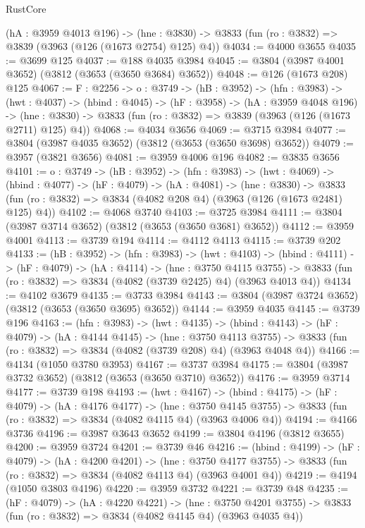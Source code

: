 \begin{lexlean}{RustCore}
\begin{coremodule}
  (hA : @3959 @4013 @196) ->
  (hne : @3830) -> @3833 (fun (ro : @3832) => @3839 (@3963 (@126 (@1673 @2754) @125) @4))
@4034 := @4000 @3655
@4035 := @3699 @125
@4037 := @188 @4035 @3984
@4045 := @3804 (@3987 @4001 @3652) (@3812 (@3653 (@3650 @3684) @3652))
@4048 := @126 (@1673 @208) @125
@4067 := {F : @2256} ->
  {o : @3749} ->
  (hB : @3952) ->
  (hfn : @3983) ->
  (hwt : @4037) ->
  (hbind : @4045) ->
  (hF : @3958) ->
  (hA : @3959 @4048 @196) ->
  (hne : @3830) -> @3833 (fun (ro : @3832) => @3839 (@3963 (@126 (@1673 @2711) @125) @4))
@4068 := @4034 @3656
@4069 := @3715 @3984
@4077 := @3804 (@3987 @4035 @3652) (@3812 (@3653 (@3650 @3698) @3652))
@4079 := @3957 (@3821 @3656)
@4081 := @3959 @4006 @196
@4082 := @3835 @3656
@4101 := {o : @3749} ->
  (hB : @3952) ->
  (hfn : @3983) ->
  (hwt : @4069) ->
  (hbind : @4077) ->
  (hF : @4079) ->
  (hA : @4081) ->
  (hne : @3830) ->
  @3833 (fun (ro : @3832) => @3834 (@4082 @208 @4) (@3963 (@126 (@1673 @2481) @125) @4))
@4102 := @4068 @3740
@4103 := @3725 @3984
@4111 := @3804 (@3987 @3714 @3652) (@3812 (@3653 (@3650 @3681) @3652))
@4112 := @3959 @4001
@4113 := @3739 @194
@4114 := @4112 @4113
@4115 := @3739 @202
@4133 := (hB : @3952) ->
  (hfn : @3983) ->
  (hwt : @4103) ->
  (hbind : @4111) ->
  (hF : @4079) ->
  (hA : @4114) ->
  (hne : @3750 @4115 @3755) ->
  @3833 (fun (ro : @3832) => @3834 (@4082 (@3739 @2425) @4) (@3963 @4013 @4))
@4134 := @4102 @3679
@4135 := @3733 @3984
@4143 := @3804 (@3987 @3724 @3652) (@3812 (@3653 (@3650 @3695) @3652))
@4144 := @3959 @4035
@4145 := @3739 @196
@4163 := (hfn : @3983) ->
  (hwt : @4135) ->
  (hbind : @4143) ->
  (hF : @4079) ->
  (hA : @4144 @4145) ->
  (hne : @3750 @4113 @3755) ->
  @3833 (fun (ro : @3832) => @3834 (@4082 (@3739 @208) @4) (@3963 @4048 @4))
@4166 := @4134 (@1050 @3780 @3953)
@4167 := @3737 @3984
@4175 := @3804 (@3987 @3732 @3652) (@3812 (@3653 (@3650 @3710) @3652))
@4176 := @3959 @3714
@4177 := @3739 @198
@4193 := (hwt : @4167) ->
  (hbind : @4175) ->
  (hF : @4079) ->
  (hA : @4176 @4177) ->
  (hne : @3750 @4145 @3755) -> @3833 (fun (ro : @3832) => @3834 (@4082 @4115 @4) (@3963 @4006 @4))
@4194 := @4166 @3736
@4196 := @3987 @3643 @3652
@4199 := @3804 @4196 (@3812 @3655)
@4200 := @3959 @3724
@4201 := @3739 @46
@4216 := (hbind : @4199) ->
  (hF : @4079) ->
  (hA : @4200 @4201) ->
  (hne : @3750 @4177 @3755) -> @3833 (fun (ro : @3832) => @3834 (@4082 @4113 @4) (@3963 @4001 @4))
@4219 := @4194 (@1050 @3803 @4196)
@4220 := @3959 @3732
@4221 := @3739 @48
@4235 := (hF : @4079) ->
  (hA : @4220 @4221) ->
  (hne : @3750 @4201 @3755) -> @3833 (fun (ro : @3832) => @3834 (@4082 @4145 @4) (@3963 @4035 @4))

\end{coremodule}
\end{lexlean}
